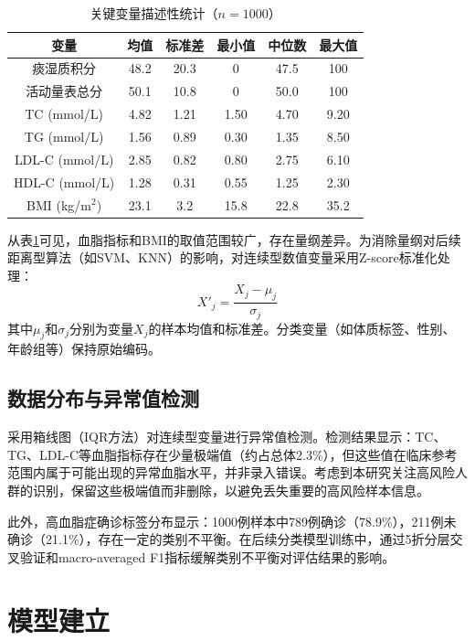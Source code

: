 \documentclass[12pt,a4paper]{ctexart}
\begin{document}
\begin{table}[H]
\centering
\begin{tabular}{cccccc}
\toprule
\textbf{变量} & \textbf{均值} & \textbf{标准差} & \textbf{最小值} & \textbf{中位数} & \textbf{最大值} \\
\midrule
痰湿质积分 & 48.2 & 20.3 & 0 & 47.5 & 100 \\
活动量表总分 & 50.1 & 10.8 & 0 & 50.0 & 100 \\
TC (mmol/L) & 4.82 & 1.21 & 1.50 & 4.70 & 9.20 \\
TG (mmol/L) & 1.56 & 0.89 & 0.30 & 1.35 & 8.50 \\
LDL-C (mmol/L) & 2.85 & 0.82 & 0.80 & 2.75 & 6.10 \\
HDL-C (mmol/L) & 1.28 & 0.31 & 0.55 & 1.25 & 2.30 \\
BMI (kg/m$^2$) & 23.1 & 3.2 & 15.8 & 22.8 & 35.2 \\
\bottomrule
\end{tabular}
\caption{关键变量描述性统计（$n=1000$）}
\label{tab:desc_stats}
\end{table}

从表\ref{tab:desc_stats}可见，血脂指标和BMI的取值范围较广，存在量纲差异。为消除量纲对后续距离型算法（如SVM、KNN）的影响，对连续型数值变量采用Z-score标准化处理：
\begin{equation}
    X'_j = \frac{X_j - \mu_j}{\sigma_j}
\end{equation}
其中$\mu_j$和$\sigma_j$分别为变量$X_j$的样本均值和标准差。分类变量（如体质标签、性别、年龄组等）保持原始编码。

\subsection{数据分布与异常值检测}

采用箱线图（IQR方法）对连续型变量进行异常值检测。检测结果显示：TC、TG、LDL-C等血脂指标存在少量极端值（约占总体2.3\%），但这些值在临床参考范围内属于可能出现的异常血脂水平，并非录入错误。考虑到本研究关注高风险人群的识别，保留这些极端值而非删除，以避免丢失重要的高风险样本信息。

此外，高血脂症确诊标签分布显示：1000例样本中789例确诊（78.9\%），211例未确诊（21.1\%），存在一定的类别不平衡。在后续分类模型训练中，通过5折分层交叉验证和macro-averaged F1指标缓解类别不平衡对评估结果的影响。

\section{模型建立}
\end{document}
